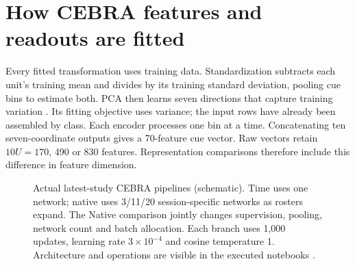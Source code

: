 \documentclass[10pt,a4paper]{article}
\begin{document}
\section{How CEBRA features and readouts are fitted}\label{sec:models}
Every fitted transformation uses training data. Standardization subtracts each unit's training mean and divides by its training standard deviation, pooling cue bins to estimate both. PCA then learns seven directions that capture training variation \cite{dimred}. Its fitting objective uses variance; the input rows have already been assembled by class. Each encoder processes one bin at a time. Concatenating ten seven-coordinate outputs gives a 70-feature cue vector. Raw vectors retain $10U=170$, 490 or 830 features. Representation comparisons therefore include this difference in feature dimension.

\begin{figure}[h!]
\centering
{}
\caption{Actual latest-study CEBRA pipelines (schematic). Time uses one network; native uses 3/11/20 session-specific networks as rosters expand. The Native comparison jointly changes supervision, pooling, network count and batch allocation. Each branch uses 1,000 updates, learning rate $3\times10^{-4}$ and cosine temperature 1. Architecture and operations are visible in the executed notebooks \cite{latest,reproduction}.}
\label{fig:models}
\end{figure}
\end{document}
